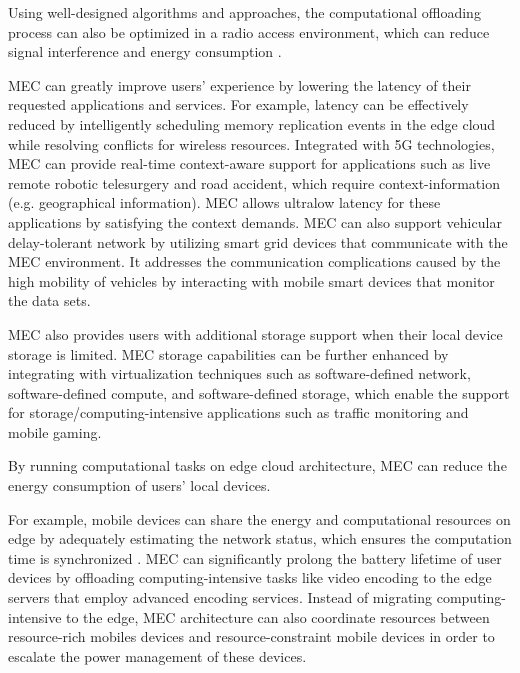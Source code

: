 Using well-designed algorithms and approaches, the computational offloading process can also be optimized in a radio access environment, which can reduce signal interference and energy consumption \cite{chen2015efficient, sardellitti2015joint}. 



MEC can greatly improve users' experience by lowering the latency of their requested applications and services. 
For example, latency can be effectively reduced by intelligently scheduling memory replication events in the edge cloud while resolving conflicts for wireless resources\cite{abdelwahab2015replisom}.
%
Integrated with 5G technologies, MEC can provide real-time context-aware support for applications such as live remote robotic telesurgery and road accident\cite{nunna2015enabling}, which require context-information (e.g. geographical information). MEC allows ultralow latency for these applications by satisfying the context demands.
%
MEC can also support vehicular delay-tolerant network by utilizing smart grid devices that communicate with the MEC environment. It addresses the communication complications caused by the high mobility of vehicles by interacting with mobile smart devices that monitor the data sets\cite{kumar2016vehicular}.

MEC also provides users with additional storage support when their local device storage is limited. MEC storage capabilities can be further enhanced by integrating with virtualization techniques such as software-defined network, software-defined compute, and software-defined storage\cite{jararweh2016sdmec}, which enable the support for storage/computing-intensive applications such as traffic monitoring and mobile gaming.

By running computational tasks on edge cloud architecture, MEC can reduce the energy consumption of users' local devices. 

For example, mobile devices can share the energy and computational resources on edge by adequately estimating the network status, which ensures the computation time is synchronized \cite{gao2014opportunistic}. 
%
MEC can significantly prolong the battery lifetime of user devices by offloading computing-intensive tasks like video encoding to the edge servers that employ advanced encoding services\cite{beck2015me}. Instead of migrating computing-intensive to the edge, MEC architecture can also coordinate resources between resource-rich mobiles devices and resource-constraint mobile devices in order to escalate the power management of these devices.

